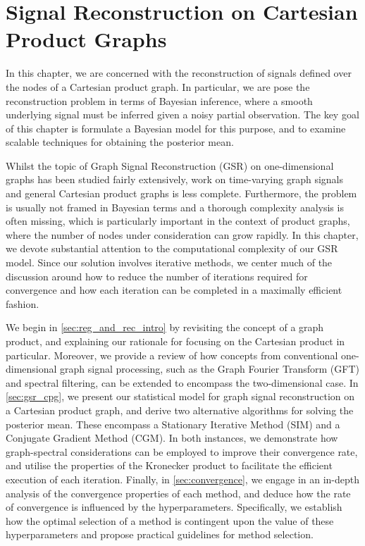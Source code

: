 \chapter{Signal Reconstruction on Cartesian Product Graphs}

\label{chap:gsr_2d}


In this chapter, we are concerned with the reconstruction of signals defined over the nodes of a Cartesian product graph. In particular, we are pose the reconstruction problem in terms of Bayesian inference, where a smooth underlying signal must be inferred given a noisy partial observation. The key goal of this chapter is formulate a Bayesian model for this purpose, and to examine scalable techniques for obtaining the posterior mean. 

Whilst the topic of Graph Signal Reconstruction (GSR) on one-dimensional graphs has been studied fairly extensively, work on time-varying graph signals and general Cartesian product graphs is less complete. Furthermore, the problem is usually not framed in Bayesian terms and a thorough complexity analysis is often missing, which is particularly important in the context of product graphs, where the number of nodes under consideration can grow rapidly. In this chapter, we devote substantial attention to the computational complexity of our GSR model. Since our solution involves iterative methods, we center much of the discussion around how to reduce the number of iterations required for convergence and how each iteration can be completed in a maximally efficient fashion. 

We begin in \cref{sec:reg_and_rec_intro} by revisiting the concept of a graph product, and explaining our rationale for focusing on the Cartesian product in particular. Moreover, we provide a review of how concepts from conventional one-dimensional graph signal processing, such as the Graph Fourier Transform (GFT) and spectral filtering, can be extended to encompass the two-dimensional case. In \cref{sec:gsr_cpg}, we present our statistical model for graph signal reconstruction on a Cartesian product graph, and derive two alternative algorithms for solving the posterior mean. These encompass a Stationary Iterative Method (SIM) and a Conjugate Gradient Method (CGM). In both instances, we demonstrate how graph-spectral considerations can be employed to improve their convergence rate, and utilise the properties of the Kronecker product to facilitate the efficient execution of each iteration. Finally, in \cref{sec:convergence}, we engage in an in-depth analysis of the convergence properties of each method, and deduce how the rate of convergence is influenced by the hyperparameters. Specifically, we establish how the optimal selection of a method is contingent upon the value of these hyperparameters and propose practical guidelines for method selection.


